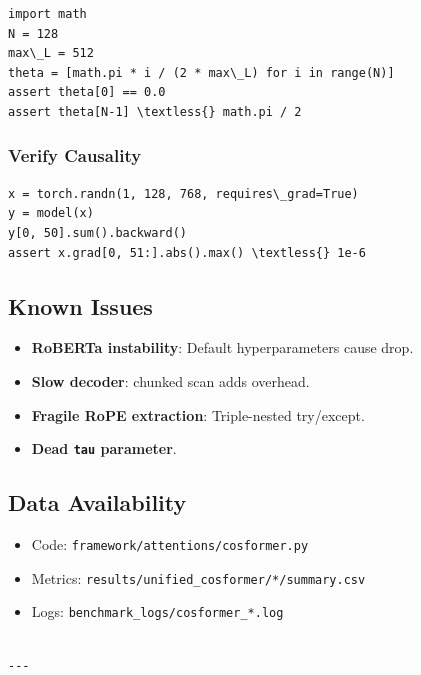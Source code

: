 \begin{lstlisting}
import math
N = 128
max\_L = 512
theta = [math.pi * i / (2 * max\_L) for i in range(N)]
assert theta[0] == 0.0
assert theta[N-1] \textless{} math.pi / 2
\end{lstlisting}

\subsubsection{Verify Causality}

\begin{lstlisting}
x = torch.randn(1, 128, 768, requires\_grad=True)
y = model(x)
y[0, 50].sum().backward()
assert x.grad[0, 51:].abs().max() \textless{} 1e-6
\end{lstlisting}

\subsection{Known Issues}

\begin{itemize}
\item \textbf{RoBERTa instability}: Default hyperparameters cause drop.
\item \textbf{Slow decoder}: chunked scan adds overhead.
\item \textbf{Fragile RoPE extraction}: Triple-nested try/except.
\item \textbf{Dead \texttt{tau} parameter}.

\end{itemize}
\subsection{Data Availability}

\begin{itemize}
\item Code: \texttt{framework/attentions/cosformer.py}
\item Metrics: \texttt{results/unified\_cosformer/*/summary.csv}
\item Logs: \texttt{benchmark\_logs/cosformer\_*.log}
\end{itemize}
\begin{lstlisting}

---
\end{lstlisting}